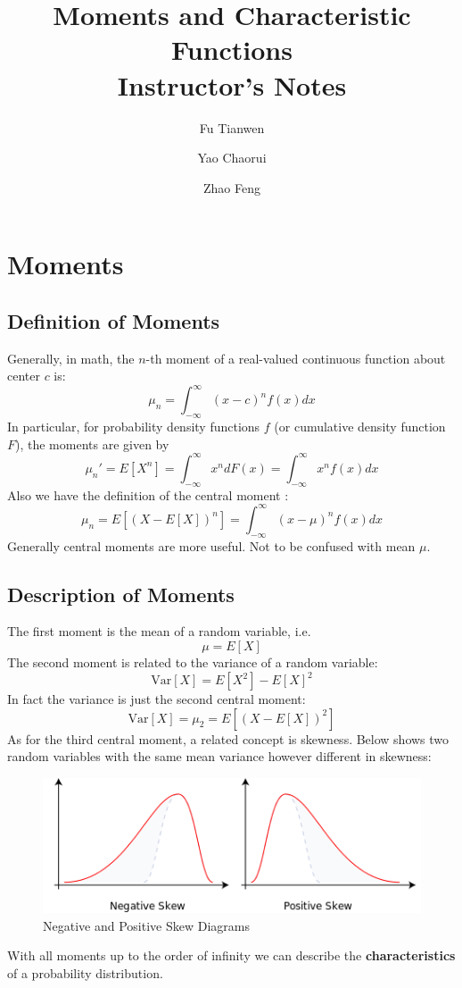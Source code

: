 \documentclass{article}
\title{Moments and Characteristic Functions\\Instructor's Notes}
\author{Fu Tianwen \and Yao Chaorui \and Zhao Feng}
\theoremstyle{definition}
\begin{document}
	
\begin{titlepage}
	\maketitle
\end{titlepage}
\tableofcontents
\clearpage
\section{Moments}
\subsection{Definition of Moments}
Generally, in math, the $n$-th moment of a real-valued continuous function about center $c$ is: \cite{wiki:moment}
$$
\mu_n=\int_{-\infty}^\infty (x-c)^nf(x)dx
$$
In particular, for probability density functions $f$ (or cumulative density function $F$), the moments are given by
$$ \mu_n' = E[X^n] = \int_{-\infty}^\infty x^ndF(x) = \int_{-\infty}^\infty x^nf(x)dx $$
Also we have the definition of the central moment \cite{wiki:centralMoment}:
$$
\mu_n = E[(X-E[X])^n] = \int_{-\infty}^\infty (x-\mu)^nf(x)dx
$$
Generally central moments are more useful. Not to be confused with mean $\mu$.
\subsection{Description of Moments}
The first moment is the mean of a random variable, i.e. $$\mu=E[X]$$
The second moment is related to the variance of a random variable:
$$ \text{Var}[X] = E[X^2]-{E[X]}^2$$
In fact the variance is just the second central moment:
$$ \text{Var}[X] = \mu_2 = E[(X-E[X])^2]$$
As for the third central moment, a related concept is skewness. Below shows two random variables with the same mean variance however different in skewness\cite{wiki:skewness}:
\begin{figure}[H]
	\centering
	\includegraphics[width=0.8\linewidth]{img/Negative_and_positive_skew_diagrams_(English)}
	\caption{Negative and Positive Skew Diagrams} 
	\label{fig:skewness}
\end{figure}
With all moments up to the order of infinity we can describe the \textbf{characteristics} of a probability distribution.
\end{document}
